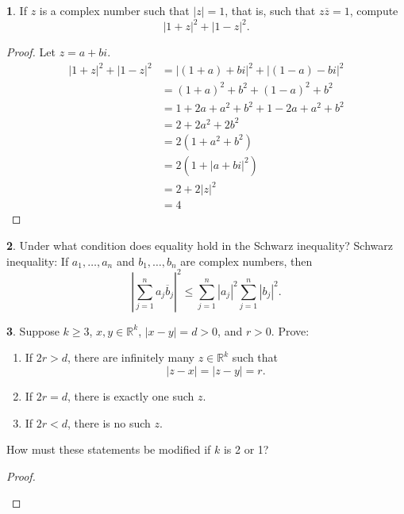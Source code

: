 \documentclass[12pt]{article}
\theoremstyle{definition}
\newtheorem{ex}{}
\begin{document}
\begin{ex}
	If $z$ is a complex number such that $|z| = 1$, that is, such that $z\overline{z}=1$, compute \begin{equation*}
		|1 + z|^2 + |1 - z|^2.
	\end{equation*}
\end{ex}
\begin{proof}
	Let $z = a + bi$.
	\begin{align*}
		|1+z|^2 + |1-z|^2 & = \left| (1 + a) + bi \right|^2 + \left| (1 - a) - bi \right|^2 \\
		                  & = (1 + a)^2 + b^2 + (1 - a)^2 + b^2                             \\
		                  & = 1 + 2a + a^2 + b^2 + 1 - 2a + a^2 + b^2                       \\
		                  & = 2 + 2a^2 + 2b^2                                               \\
		                  & = 2(1 + a^2 + b^2)                                              \\
		                  & = 2(1 + |a + bi|^2)                                             \\
		                  & = 2 + 2|z|^2                                                    \\
		                  & = 4
	\end{align*}
\end{proof}

\begin{ex}
	Under what condition does equality hold in the Schwarz inequality?
	Schwarz inequality: If $a_1, \dots, a_n$ and $b_1, \dots, b_n$ are complex numbers, then \begin{equation*}
		\left| \sum_{j=1}^n a_j \overline{b}_j \right|^2 \leq \sum_{j = 1}^n |a_j|^2\sum_{j = 1}^n |b_j|^2.
	\end{equation*}
\end{ex}

\begin{ex}
	Suppose $k \geq 3$, $x, y \in \mathbb{R}^k$, $|x - y| = d > 0$, and $r > 0$.
	Prove: \begin{enumerate}[label=(\alph*)]
		\item If $2r > d$, there are infinitely many $z \in \mathbb{R}^k$ such that \begin{equation*}
			      |z - x| = |z - y| = r.
		      \end{equation*}
		\item If $2r = d$, there is exactly one such $z$.
		\item If $2r < d$, there is no such $z$.
	\end{enumerate}
	How must these statements be modified if $k$ is 2 or 1?
\end{ex}
\begin{proof}
  \begin{enumerate}[label=(\alph*)]\end{enumerate}
\end{proof}
\end{document}
